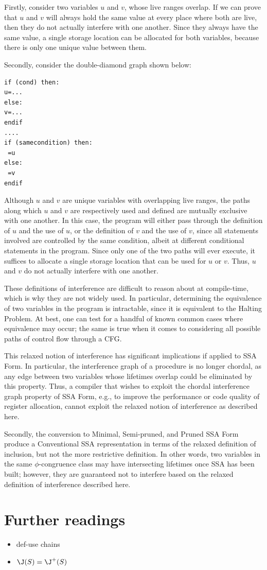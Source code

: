 Firstly, consider two variables $u$ and $v$, whose live ranges overlap.
If we can prove that $u$ and $v$ will always hold the same value
at every place where both are live, then they do not actually interfere
with one another. Since they always have the same value, a single 
storage location can be allocated for both variables, because there
is only one unique value between them.

Secondly, consider the double-diamond graph shown below:

\begin{verbatim}
if (cond) then:
u=...
else:
v=...
endif
....
if (samecondition) then:
 =u
else:
 =v
endif
\end{verbatim}

Although $u$ and $v$ are unique variables with overlapping live
ranges, the paths along which $u$ and $v$ are respectively used and
defined are mutually exclusive with one another. In this case, the
program will either pass through the definition of $u$ and the use
of $u$, or the definition of $v$ and the use of $v$, since all
statements involved are controlled by the same condition, albeit
at different conditional statements in the program. Since only
one of the two paths will ever execute, it suffices to allocate a 
single storage location that can be used for $u$ or $v$. Thus, $u$
and $v$ do not actually interfere with one another. 
 
These definitions of interference are difficult to reason about at 
compile-time, which is why they are not widely used. In particular,
determining the equivalence of two variables in the program is
intractable, since it is equivalent to the Halting Problem. At best,
one can test for a handful of known common cases where 
equivalence may occur; the same is true when it comes to considering
all possible paths of control flow through a CFG. 

This relaxed notion of interference has significant implications if
applied to SSA Form. In particular, the interference graph of a procedure
is no longer chordal, as any edge between two variables whose lifetimes
overlap could be eliminated by this property. Thus, a compiler that
wishes to exploit the chordal interference graph property of SSA Form, 
e.g., to improve the performance or code quality of register allocation,
cannot exploit the relaxed notion of interference as described here.

Secondly, the conversion to Minimal, Semi-pruned, and Pruned SSA Form
produce a Conventional SSA representation in terms of the relaxed 
definition of inclusion, but not the more restrictive definition. In other
words, two variables in the same $\phi$-congruence class may have 
intersecting lifetimes once SSA has been built; however, they are
guaranteed not to interfere based on the relaxed definition
of interference described here. 



\section{Further readings}
\begin{itemize}
\item def-use chains
\item $\J(S)=\J^+(S)$
\end{itemize}

